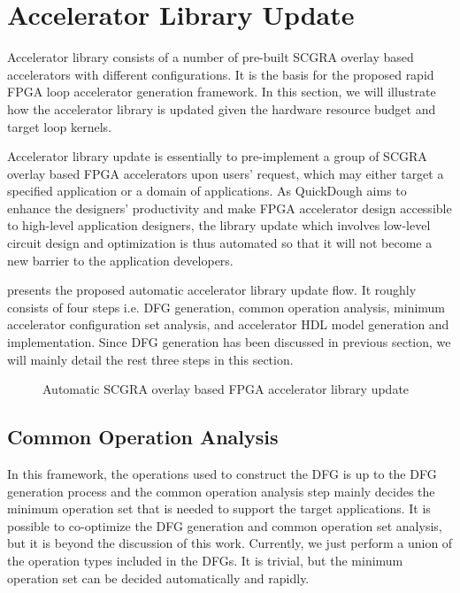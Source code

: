 \section{Accelerator Library Update} \label{sec:library-update}
Accelerator library consists of a number of pre-built SCGRA overlay based accelerators with different configurations. It is the basis for the proposed rapid FPGA loop accelerator generation framework. In this section, we will illustrate how the accelerator library is updated given the hardware resource budget and target loop kernels.

Accelerator library update is essentially to pre-implement a group of SCGRA overlay based FPGA accelerators upon users' request, which may either target a specified application or a domain of applications. As QuickDough aims to enhance the designers' productivity and make FPGA accelerator design accessible to high-level application designers, the library update which involves low-level circuit design and optimization is thus automated so that it will not become a new barrier to the application developers.

 presents the proposed automatic accelerator library update flow. It roughly consists of four steps i.e. DFG generation, common operation analysis, minimum accelerator configuration set analysis, and accelerator HDL model generation and implementation. Since DFG generation has been discussed in previous section, we will mainly detail the rest three steps in this section.

\begin{figure}
\caption{Automatic SCGRA overlay based FPGA accelerator library update}
\label{fig:auto-lib-gen}
\end{figure}

\subsection{Common Operation Analysis}
In this framework, the operations used to construct the DFG is up to the DFG generation process and the common operation analysis step mainly decides the minimum operation set that is needed to support the target applications. It is possible to co-optimize the DFG generation and common operation set analysis, but it is beyond the discussion of this work. Currently, we just perform a union of the operation types included in the DFGs. It is trivial, but the minimum operation set can be decided automatically and rapidly.

